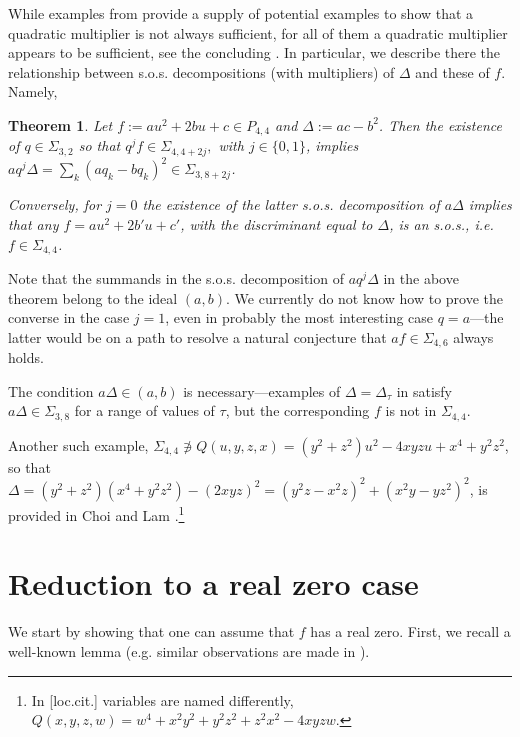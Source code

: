 \documentclass[a4paper,twoside,reqno]{amsart}
\newcommand{\PHF}[2]{P_{{#2},{#1}}}
\newcommand{\SosHF}[2]{\Sigma_{{#2},{#1}}}
\newcommand{\SosH}[2]{\Sigma_{{#1},{#2}}}
\theoremstyle{plain}
\newtheorem{thm}[prop]{Theorem}
\theoremstyle{definition}
\theoremstyle{remark}
\begin{document}
While examples from  provide a supply of potential
examples to show that a quadratic multiplier is not always sufficient,
for all of them a quadratic multiplier appears to be sufficient,
see the concluding . In particular,
we describe there the relationship between s.o.s.
decompositions (with multipliers) of $\Delta$ and these of $f$. Namely,
\begin{thm}\label{thm:sos34}
Let $f:=au^2+2bu+c\in\PHF{4}{4}$ and $\Delta:=ac-b^2$. 
Then the existence of $q\in\SosHF{2}{3}$ so that $q^j f\in\SosHF{4+2j}{4},$
with $j\in\{0,1\}$, implies
$aq^j\Delta=\sum_{k}(aq_k-bq_k)^2\in\SosHF{8+2j}{3}$. 

Conversely, for $j=0$ the existence of the latter s.o.s. decomposition of $a\Delta$ implies that 
any $f=au^2+2b'u+c'$, with the discriminant equal to $\Delta$, is an s.o.s., i.e. $f\in\SosHF{4}{4}$.
\end{thm}
Note that the summands in the s.o.s. decomposition of
$aq^j\Delta$ in the above theorem belong to the ideal $(a,b)$.
We currently do not know how to prove the converse in the case $j=1$,
even in probably the most interesting case $q=a$---the latter would
be on a path to resolve a natural conjecture that $af\in\SosH{4}{6}$
always holds.

The condition $a\Delta\in (a,b)$ is necessary---examples of $\Delta=\Delta_{\tau}$ in 
 satisfy $a\Delta\in\SosHF{8}{3}$ for a range of values of $\tau$, but the corresponding $f$ is not in $\SosHF{4}{4}$.

Another such example, 
$\SosH{4}{4}\not\ni Q(u,y,z,x)%
=(y^2+z^2)u^2-4xyzu+x^4+y^2z^2$,
so that $\Delta=(y^2+z^2)(x^4+y^2z^2)-(2xyz)^2=(y^2z-x^2z)^2+(x^2y-yz^2)^2$,
is provided in Choi and Lam \cite{ChLa77}.\footnote{In [loc.cit.] variables are named differently, $Q(x,y,z,w)=w^4+x^2y^2+y^2z^2+z^2x^2-4xyzw$.}

\section{Reduction to a real zero case}\label{sect:red0}
We start by showing that one can assume that $f$ has a real zero.
First, we recall a well-known lemma (e.g. similar observations
are made in \cite{MR2975385}).
\end{document}

